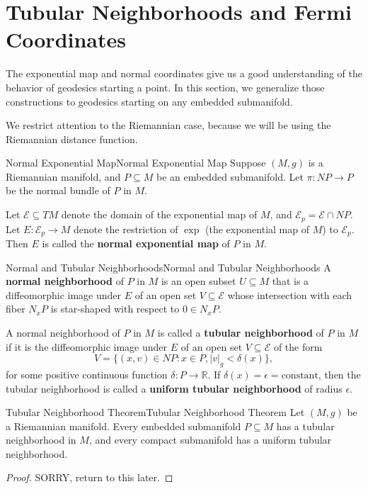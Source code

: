 \documentclass[../main.tex]{subfiles}
\begin{document}
\section{Tubular Neighborhoods and Fermi Coordinates}
The exponential map and normal coordinates give us a good understanding of the behavior of geodesics starting a point. In this section, we generalize those constructions to geodesics starting on any embedded submanifold.

We restrict attention to the Riemannian case, because we will be using the Riemannian distance function.

\begin{definition}{Normal Exponential Map}{Normal Exponential Map}
	Suppose $(M, g)$ is a Riemannian manifold, and $P \subseteq M$ be an embedded submanifold. Let $\pi: NP \to P$ be the normal bundle of $P$ in $M$.

	Let $\mathcal{E} \subseteq TM$ denote the domain of the exponential map of $M$, and $\mathcal{E}_p = \mathcal{E} \cap NP$. Let $E: \mathcal{E}_p \to M$ denote the restriction of $\exp$ (the exponential map of $M$) to $\mathcal{E}_p$. Then $E$ is called the \textbf{normal exponential map} of $P$ in $M$.
\end{definition}

\begin{definition}{Normal and Tubular Neighborhoods}{Normal and Tubular Neighborhoods}
	A \textbf{normal neighborhood} of $P$ in $M$ is an open subset $U \subseteq M$ that is a diffeomorphic image under $E$ of an open set $V \subseteq \mathcal{E}$ whose intersection with each fiber $N_x P$ is star-shaped with respect to $0 \in N_x P$.

	\medskip
	A normal neighborhood of $P$ in $M$ is called a \textbf{tubular neighborhood} of $P$ in $M$ if it is the diffeomorphic image under $E$ of an open set $V \subseteq \mathcal{E}$ of the form
	\begin{equation}
		V = \{ (x, v) \in NP : x \in P, |v|_g < \delta(x) \},
	\end{equation}
	for some positive continuous function $\delta: P \to \mathbb{R}$. If $\delta(x) = \epsilon = \text{constant}$, then the tubular neighborhood is called a \textbf{uniform tubular neighborhood} of radius $\epsilon$.
\end{definition}

\begin{theorem}{Tubular Neighborhood Theorem}{Tubular Neighborhood Theorem}
	Let $(M, g)$ be a Riemannian manifold. Every embedded submanifold $P \subseteq M$ has a tubular neighborhood in $M$, and every compact submanifold has a uniform tubular neighborhood. 
\end{theorem}
\begin{proof}
	SORRY, return to this later.
\end{proof}
\end{document}
